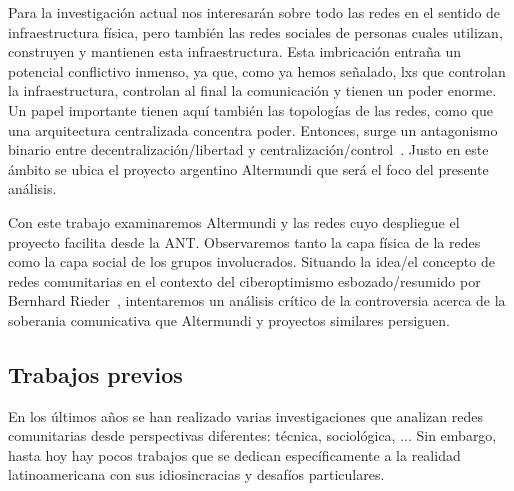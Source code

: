 \begin{comment}
por qué es importante/interesante?
	\item Erläutern Sie kurz, in welchem Themenbereich Ihre Arbeit angesiedelt ist. Wo werden Sie einen Beitrag leisten?
	\item Das Ziel sollte es sein, den groben Kontext Ihrer Arbeit darzustellen.

Política digital <-- Gabriella Coleman heranziehen

\end{comment}

Para la investigación actual nos interesarán sobre todo las redes en el sentido de infraestructura física, pero también las redes sociales de personas cuales utilizan, construyen y mantienen esta infraestructura.
Esta imbricación entraña un potencial conflictivo inmenso, ya que, como ya hemos señalado, lxs que controlan la infraestructura, controlan al final la comunicación y tienen un poder enorme.
Un papel importante tienen aquí también las topologías de las redes, como que una arquitectura centralizada concentra poder.
Entonces, surge un antagonismo binario entre decentralización/libertad y centralización/control~\autocite{FiTre2015}.
Justo en este ámbito se ubica el proyecto argentino Altermundi que será el foco del presente análisis.



Con este trabajo examinaremos Altermundi y las redes cuyo despliegue el proyecto facilita desde la ANT.
Observaremos tanto la capa física de la redes como la capa social de los grupos involucrados.
Situando la idea/el concepto de redes comunitarias en el contexto del ciberoptimismo esbozado/resumido por Bernhard Rieder~\autocite{Rieder2012}, intentaremos un análisis crítico de la controversia acerca de la soberania comunicativa que Altermundi y proyectos similares persiguen.

\subsection{Trabajos previos}

En los últimos años se han realizado varias investigaciones que analizan redes comunitarias desde perspectivas diferentes: técnica, sociológica, ...
Sin embargo, hasta hoy hay pocos trabajos que se dedican específicamente a la realidad latinoamericana con sus idiosincracias y desafíos particulares.


